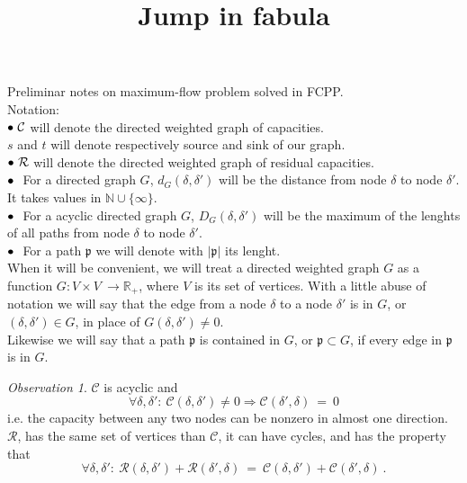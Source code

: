 \documentclass{article}
\title{Jump in fabula}
\author{}
\date{}
\theoremstyle{plain}
\theoremstyle{definition}
\theoremstyle{remark}
\newtheorem{oss}{Observation}
\begin{document}
Preliminar notes on maximum-flow problem solved in FCPP.\\
Notation:\\
 $\small\bullet\ \mathcal{C}$ will denote the directed weighted graph of capacities.\\
 $s$ and $t$ will denote respectively source and sink of our graph.\\
 $\small\bullet\ \mathcal{R}$ will denote the directed weighted graph of residual capacities.\\
 $\small\bullet\ $ For a directed graph $G$, $d_G(\delta, \delta')$ will be the distance from node $\delta$ to node $\delta'$. It takes values in $\mathbb{N}\cup\{\infty \}$.\\
 $\small\bullet\ $ For a acyclic directed graph $G$, $D_G(\delta, \delta')$ will be the maximum of the lenghts of all paths from node $\delta$ to node $\delta'$.\\
 $\small\bullet\ $  For a path $\mathfrak{p}$ we will denote with $|\mathfrak{p}|$ its lenght.\\

When it will be convenient, we will treat a directed weighted graph $G$ as a function $G: V\times V\ \rightarrow \mathbb{R_{+}}$, where $V$ is its set of vertices. With a little abuse of notation we will say that the edge from a node $\delta$ to a node $\delta'$ is in $G$, or $(\delta, \delta') \in G$,  in place of $G(\delta, \delta') \not= 0$.\\
Likewise we will say that a path $\mathfrak{p}$ is contained in $G$, or $\mathfrak{p}\subset G$, if every edge in $\mathfrak{p}$ is in $G$.\\
\begin{oss} $\mathcal{C}$ is acyclic and
\begin{equation}
\forall \delta, \delta':\ \mathcal{C}(\delta, \delta')\not= 0 \Rightarrow \mathcal{C}(\delta', \delta)\ =\ 0
\end{equation}
  i.e. the capacity between any two nodes can be nonzero in almost one direction.\\
$\mathcal{R}$, has the same set of vertices than $\mathcal{C}$, it can have cycles, and has the property that 
\begin{equation}
\forall \delta, \delta':\ \mathcal{R}(\delta, \delta')+\mathcal{R}(\delta', \delta)\ =\ \mathcal{C}(\delta, \delta')+\mathcal{C}(\delta', \delta)\ .
\end{equation}
\end{oss}
\end{document}
